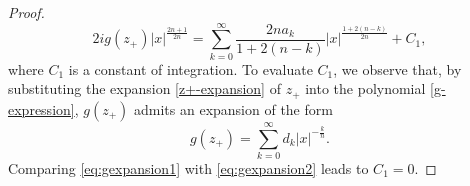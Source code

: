 \documentclass[11pt,a4paper]{article}
\numberwithin{equation}{section}
\begin{document}
\begin{proof}
\begin{equation}\label{eq:gexpansion1}
2ig(z_+)|x|^{\frac{2n+1}{2n}}=\sum_{k=0}^{\infty}\frac{2na_k}{1+2(n-k)}|x|^{\frac{1+2(n-k)}{2n}}
+C_1,
\end{equation}
where $C_1$ is a constant of integration. To evaluate $C_1$, we observe that, by substituting the expansion \eqref{z+-expansion} of $z_+$ into the polynomial \eqref{g-expression}, $g(z_+)$ admits an expansion of the form
\begin{equation}\label{eq:gexpansion2}
g(z_+)=\sum_{k=0}^{\infty}d_k |x|^{-\frac{k}{n}}.
\end{equation}
Comparing \eqref{eq:gexpansion1} with \eqref{eq:gexpansion2} leads to $C_1=0$.
\end{proof}





\end{document}
